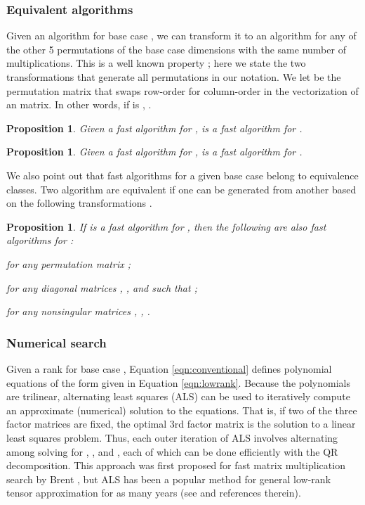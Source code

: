 \documentclass[preprint]{sigplanconf}
\newtheorem{proposition}[theorem]{Proposition}
\begin{document}
\subsubsection{Equivalent algorithms}

Given an algorithm  for base case , we can transform it to an algorithm for any of the other 5 permutations of the base case dimensions with the same number of multiplications.
This is a well known property \cite{HM73}; here we state the two transformations that generate all permutations in our notation.
We let  be the permutation matrix that swaps row-order for column-order in the vectorization of an  matrix.
In other words, if  is , .


\begin{proposition}
\label{prop:perm1}
Given a fast algorithm  for ,  is a fast algorithm for . 
\end{proposition}


\begin{proposition}
\label{prop:perm2}
Given a fast algorithm  for ,
 is a fast algorithm for .
\end{proposition}




We also point out that fast algorithms for a given base case belong to equivalence classes.
Two algorithm are equivalent if one can be generated from another based on the following transformations \cite{deGroote78a,JM86}.


\begin{proposition}
\label{prop:eqalgs}
If  is a fast algorithm for , then the following are also fast algorithms for :

for any permutation matrix ;

for any diagonal matrices , , and  such that ;

for any nonsingular matrices , , .
\end{proposition}

\subsubsection{Numerical search}

Given a rank  for base case , Equation \eqref{eqn:conventional} defines  polynomial equations of the form given in Equation \eqref{eqn:lowrank}.
Because the polynomials are trilinear, alternating least squares (ALS) can be used to iteratively compute an approximate (numerical) solution to the equations.
That is, if two of the three factor matrices are fixed, the optimal 3rd factor matrix is the solution to a linear least squares problem.
Thus, each outer iteration of ALS involves alternating among solving for , , and , each of which can be done efficiently with the QR decomposition.
This approach was first proposed for fast matrix multiplication search by Brent \cite{Brent70}, but ALS has been a popular method for general low-rank tensor approximation for as many years (see \cite{kolda2009tensor} and references therein).
\end{document}
